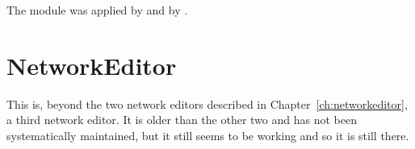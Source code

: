 The module was applied by \citet{CabritaEtcSustaincityHandbookBrusselsChapter} and by \citet[][]{ZoelligRenner_PhDThesis_2014}.

\section{NetworkEditor}
\label{sec:contrib-networkEditor}


This is, beyond the two network editors described in Chapter~\ref{ch:networkeditor}, a third network editor. 
It is older than the other two and has not been systematically maintained, but it still seems to be working and so it is still there.



